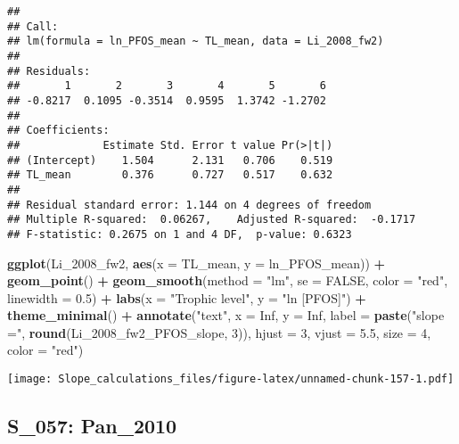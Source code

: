\documentclass[
]{article}
\newenvironment{Shaded}{\begin{snugshade}}{\end{snugshade}}
\newcommand{\AttributeTok}[1]{\textcolor[rgb]{0.13,0.29,0.53}{#1}}
\newcommand{\ConstantTok}[1]{\textcolor[rgb]{0.56,0.35,0.01}{#1}}
\newcommand{\DecValTok}[1]{\textcolor[rgb]{0.00,0.00,0.81}{#1}}
\newcommand{\FloatTok}[1]{\textcolor[rgb]{0.00,0.00,0.81}{#1}}
\newcommand{\FunctionTok}[1]{\textcolor[rgb]{0.13,0.29,0.53}{\textbf{#1}}}
\newcommand{\NormalTok}[1]{#1}
\newcommand{\SpecialCharTok}[1]{\textcolor[rgb]{0.81,0.36,0.00}{\textbf{#1}}}
\newcommand{\StringTok}[1]{\textcolor[rgb]{0.31,0.60,0.02}{#1}}
\begin{document}
\begin{verbatim}
## 
## Call:
## lm(formula = ln_PFOS_mean ~ TL_mean, data = Li_2008_fw2)
## 
## Residuals:
##       1       2       3       4       5       6 
## -0.8217  0.1095 -0.3514  0.9595  1.3742 -1.2702 
## 
## Coefficients:
##             Estimate Std. Error t value Pr(>|t|)
## (Intercept)    1.504      2.131   0.706    0.519
## TL_mean        0.376      0.727   0.517    0.632
## 
## Residual standard error: 1.144 on 4 degrees of freedom
## Multiple R-squared:  0.06267,    Adjusted R-squared:  -0.1717 
## F-statistic: 0.2675 on 1 and 4 DF,  p-value: 0.6323
\end{verbatim}

\begin{Shaded}
\begin{Highlighting}[]
\FunctionTok{ggplot}\NormalTok{(Li\_2008\_fw2, }\FunctionTok{aes}\NormalTok{(}\AttributeTok{x =}\NormalTok{ TL\_mean, }\AttributeTok{y =}\NormalTok{ ln\_PFOS\_mean)) }\SpecialCharTok{+}
  \FunctionTok{geom\_point}\NormalTok{() }\SpecialCharTok{+}
  \FunctionTok{geom\_smooth}\NormalTok{(}\AttributeTok{method =} \StringTok{"lm"}\NormalTok{, }\AttributeTok{se =} \ConstantTok{FALSE}\NormalTok{, }\AttributeTok{color =} \StringTok{"red"}\NormalTok{, }\AttributeTok{linewidth =} \FloatTok{0.5}\NormalTok{) }\SpecialCharTok{+}
  \FunctionTok{labs}\NormalTok{(}\AttributeTok{x =} \StringTok{"Trophic level"}\NormalTok{,}
       \AttributeTok{y =} \StringTok{"ln [PFOS]"}\NormalTok{) }\SpecialCharTok{+}
  \FunctionTok{theme\_minimal}\NormalTok{() }\SpecialCharTok{+}
  \FunctionTok{annotate}\NormalTok{(}\StringTok{"text"}\NormalTok{, }\AttributeTok{x =} \ConstantTok{Inf}\NormalTok{, }\AttributeTok{y =} \ConstantTok{Inf}\NormalTok{, }\AttributeTok{label =} \FunctionTok{paste}\NormalTok{(}\StringTok{"slope ="}\NormalTok{, }\FunctionTok{round}\NormalTok{(Li\_2008\_fw2\_PFOS\_slope, }\DecValTok{3}\NormalTok{)), }
           \AttributeTok{hjust =} \DecValTok{3}\NormalTok{, }\AttributeTok{vjust =} \FloatTok{5.5}\NormalTok{, }\AttributeTok{size =} \DecValTok{4}\NormalTok{, }\AttributeTok{color =} \StringTok{"red"}\NormalTok{)}
\end{Highlighting}
\end{Shaded}

\texttt{[image: Slope\_calculations\_files/figure-latex/unnamed-chunk-157-1.pdf]}

\subsection{S\_057: Pan\_2010}\label{s_057-pan_2010-1}
\end{document}
